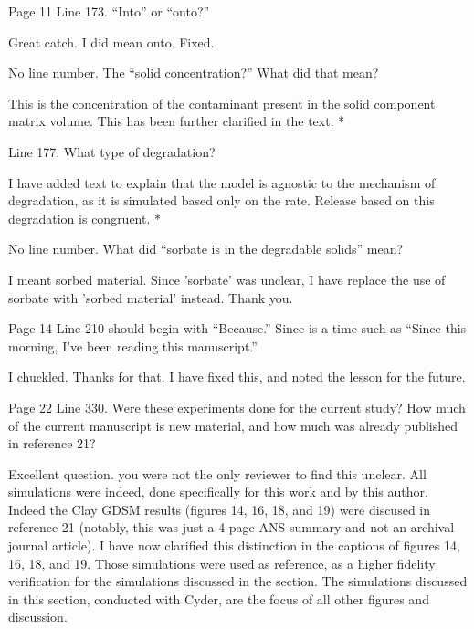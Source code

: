 \documentclass[answers,12pt]{exam}
\begin{document}
\begin{questions}
\question Page 11 Line 173. ``Into'' or ``onto?''
\begin{solution}
Great catch. I did mean onto. Fixed.
\end{solution}

\question No line number. The ``solid concentration?'' What did that mean?
\begin{solution}
This is the concentration of the contaminant present in the solid component 
        matrix volume. This has been further clarified in the text.
        {\color{red}*}
\end{solution}
 

\question Line 177. What type of degradation?
\begin{solution}
        I have added text to explain that the model is agnostic to the 
        mechanism of degradation, as it is simulated based only 
        on the rate.  Release based on this degradation is congruent.
        {\color{red}*}
\end{solution}

 

\question No line number. What did ``sorbate is in the degradable solids'' mean?
\begin{solution}
I meant sorbed material. Since 'sorbate' was unclear, I have replace the use of 
sorbate with 'sorbed material' instead. Thank you.
\end{solution}
 

\question Page 14 Line 210 should begin with ``Because.'' Since is a time such 
as ``Since this morning, I've been reading this manuscript.''
\begin{solution}
I chuckled. Thanks for that. I have fixed this, and noted the lesson for the future. 
\end{solution}

 

\question Page 22 Line 330. Were these experiments done for the current study? How much of the current manuscript is new material, and how much was already published in reference 21?
\begin{solution}
Excellent question. you were not the only reviewer to find this unclear. All 
        simulations were indeed, done specifically for this work and by this 
        author. Indeed the Clay GDSM results (figures 14, 16, 18, and 19) 
        were discused in reference 21 (notably, this was just a 4-page ANS 
        summary and not an archival journal article).
        I have now clarified this distinction in the captions of 
        figures 14, 16, 18, and 19. Those simulations were used as reference, 
        as a higher fidelity verification for the simulations discussed in the 
        section. The simulations discussed in this section, conducted with 
        Cyder, are the focus of all other figures and discussion. 
\end{solution}


\end{questions}
\end{document}
